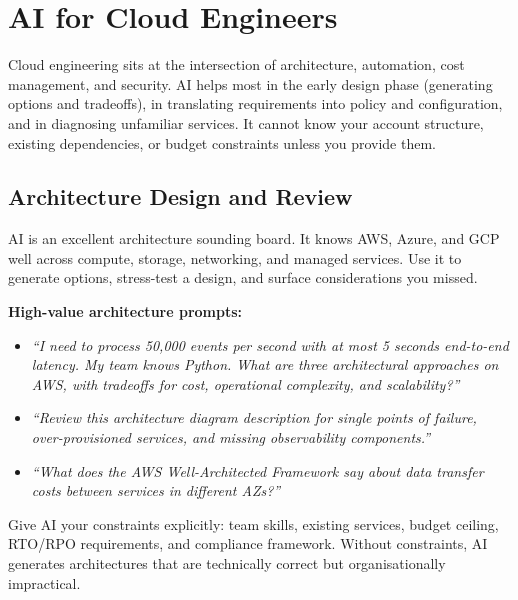 \chapter{AI for Cloud Engineers}
\label{ch:cloud}

Cloud engineering sits at the intersection of architecture, automation, cost management,
and security.
AI helps most in the early design phase (generating options and tradeoffs), in
translating requirements into policy and configuration, and in diagnosing unfamiliar
services.
It cannot know your account structure, existing dependencies, or budget constraints
unless you provide them.

\section{Architecture Design and Review}
\label{sec:arch-design}

AI is an excellent architecture sounding board.
It knows AWS, Azure, and GCP well across compute, storage, networking, and managed
services.
Use it to generate options, stress-test a design, and surface considerations you missed.

\textbf{High-value architecture prompts:}
\begin{itemize}
  \item \textit{``I need to process 50,000 events per second with at most 5 seconds end-to-end latency. My team knows Python. What are three architectural approaches on AWS, with tradeoffs for cost, operational complexity, and scalability?''}
  \item \textit{``Review this architecture diagram description for single points of failure, over-provisioned services, and missing observability components.''}
  \item \textit{``What does the AWS Well-Architected Framework say about data transfer costs between services in different AZs?''}
\end{itemize}

\begin{tipbox}
Give AI your constraints explicitly: team skills, existing services, budget ceiling,
RTO/RPO requirements, and compliance framework.
Without constraints, AI generates architectures that are technically correct but
organisationally impractical.
\end{tipbox}

